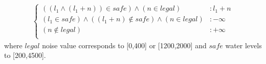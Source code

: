 \documentclass[letterpaper]{article}
\begin{document}
\begin{itemize}
{\footnotesize
\begin{align*}
\begin{cases}
((l_1 \land (l_1+n)) \in \mathit{safe}) \land (n \in \mathit{legal}) &: l_1 + n\\
(l_1  \in \mathit{safe}) \land  ((l_1+n) \notin \mathit{safe}) \land (n \in \mathit{legal}) &:  -\infty\\
(n \notin \mathit{legal})&: +\infty\\
\end{cases}
\end{align*}
}
where $\mathit{legal}$ noise value corresponds to [0,400] or [1200,2000] and $\mathit{safe}$ water levels to [200,4500]. 


\end{itemize}
\end{document}
